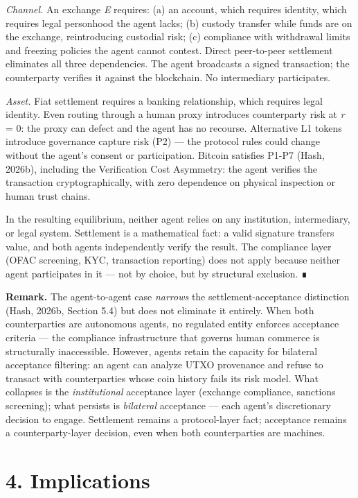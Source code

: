 \documentclass[12pt]{article}
\theoremstyle{definition}
\theoremstyle{remark}
\begin{document}
\emph{Channel.} An exchange \emph{E} requires: (a) an account, which
requires identity, which requires legal personhood the agent lacks; (b)
custody transfer while funds are on the exchange, reintroducing
custodial risk; (c) compliance with withdrawal limits and freezing
policies the agent cannot contest. Direct peer-to-peer settlement
eliminates all three dependencies. The agent broadcasts a signed
transaction; the counterparty verifies it against the blockchain. No
intermediary participates.

\emph{Asset.} Fiat settlement requires a banking relationship, which
requires legal identity. Even routing through a human proxy introduces
counterparty risk at \emph{r} = 0: the proxy can defect and the agent
has no recourse. Alternative L1 tokens introduce governance capture risk
(P2) --- the protocol rules could change without the agent's consent or
participation. Bitcoin satisfies P1-P7 (Hash, 2026b), including the
Verification Cost Asymmetry: the agent verifies the transaction
cryptographically, with zero dependence on physical inspection or human
trust chains.

In the resulting equilibrium, neither agent relies on any institution,
intermediary, or legal system. Settlement is a mathematical fact: a
valid signature transfers value, and both agents independently verify
the result. The compliance layer (OFAC screening, KYC, transaction
reporting) does not apply because neither agent participates in it ---
not by choice, but by structural exclusion. ∎

\textbf{Remark.} The agent-to-agent case \emph{narrows} the
settlement-acceptance distinction (Hash, 2026b, Section 5.4) but does
not eliminate it entirely. When both counterparties are autonomous
agents, no regulated entity enforces acceptance criteria --- the
compliance infrastructure that governs human commerce is structurally
inaccessible. However, agents retain the capacity for bilateral
acceptance filtering: an agent can analyze UTXO provenance and refuse to
transact with counterparties whose coin history fails its risk model.
What collapses is the \emph{institutional} acceptance layer (exchange
compliance, sanctions screening); what persists is \emph{bilateral}
acceptance --- each agent's discretionary decision to engage. Settlement
remains a protocol-layer fact; acceptance remains a counterparty-layer
decision, even when both counterparties are machines.


\section{4. Implications}\label{implications}
\end{document}
